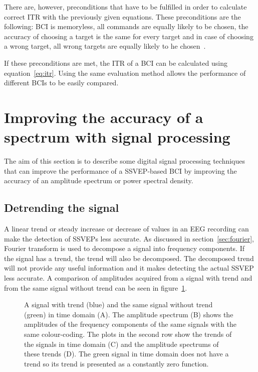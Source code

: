 There are, however, preconditions that have to be fulfilled in order to calculate correct \gls{ITR} with the previously given equations. These preconditions are the following: \gls{BCI} is memoryless, all commands are equally likely to be chosen, the accuracy of choosing a target is the same for every target and in case of choosing a wrong target, all wrong targets are equally likely to he chosen~\cite{itr}.

If these preconditions are met, the \gls{ITR} of a \gls{BCI} can be calculated using equation~\ref{eq:itr}. Using the same evaluation method allows the performance of different \glspl{BCI} to be easily compared.

\section{Improving the accuracy of a spectrum with signal processing}

The aim of this section is to describe some digital signal processing techniques that can improve the performance of a \gls{SSVEP}-based \gls{BCI} by improving the accuracy of an amplitude spectrum or \gls{power spectral density}.

\subsection{Detrending the signal}

A linear \gls{trend} or steady increase or decrease of values in an \gls{EEG} recording can make the detection of \glspl{SSVEP} less accurate. As discussed in section~\ref{sec:fourier}, \gls{Fourier transform} is used to decompose a signal into \glspl{frequency component}. If the signal has a \gls{trend}, the \gls{trend} will also be decomposed. The decomposed \gls{trend} will not provide any useful information and it makes detecting the actual \gls{SSVEP} less accurate. A comparison of amplitudes acquired from a signal with trend and from the same signal without \gls{trend} can be seen in figure~\ref{fig:detrend}.

\begin{figure}[h!]
	
	\caption{A signal with trend (blue) and the same signal without trend (green) in time domain (A). The amplitude spectrum (B) shows the amplitudes of the frequency components of the same signals with the same colour-coding. The plots in the second row show the trends of the signals in time domain (C) and the amplitude spectrums of these trends (D). The green signal in time domain does not have a trend so its trend is presented as a constantly zero function.}
	\label{fig:detrend}
\end{figure}

